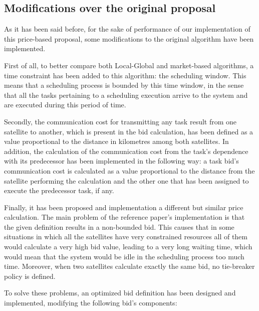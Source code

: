 
\subsection{Modifications over the original proposal}
As it has been said before, for the sake of performance of our implementation of this price-based proposal, some modifications to the original algorithm have been implemented.

First of all, to better compare both Local-Global and market-based algorithms, a time constraint has been added to this algorithm: the scheduling window. This means that a scheduling process is bounded by this time window, in the sense that all the tasks pertaining to a scheduling execution arrive to the system and are executed during this period of time.

Secondly, the communication cost for transmitting any task result from one satellite to another, which is present in the bid calculation, has been defined as a value proportional to the distance in kilometres among both satellites. In addition, the calculation of the communication cost from the task's dependence with its predecessor has been implemented in the following way: a task bid's communication cost is calculated as a value proportional to the distance from the satellite performing the calculation and the other one that has been assigned to execute the predecessor task, if any.

Finally, it has been proposed and implementation a different but similar price calculation. The main problem of the reference paper's implementation is that the given definition results in a non-bounded bid. This causes that in some situations in which all the satellites have very constrained resources all of them would calculate a very high bid value, leading to a very long waiting time, which would mean that the system would be idle in the scheduling process too much time. Moreover, when two satellites calculate exactly the same bid, no tie-breaker policy is defined.

To solve these problems, an optimized bid definition has been designed and implemented, modifying the following bid's components:

